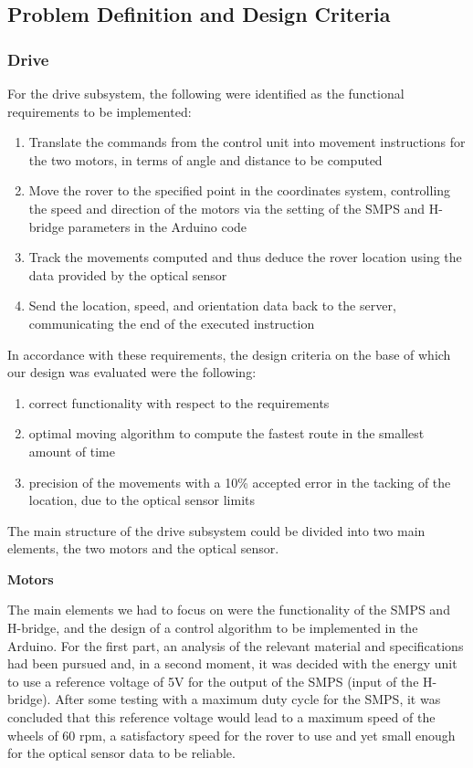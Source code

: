 \documentclass[10pt,twoside]{article}
\begin{document}
\subsection{Problem Definition and Design Criteria}

\subsubsection{Drive}

For the drive subsystem, the following were identified as the functional requirements to be implemented: 
\begin{enumerate} %
    \item Translate the commands from the control unit into movement instructions for the two motors, in terms of angle and distance to be computed
    \item Move the rover to the specified point in the coordinates system, controlling the speed and direction of the motors via the setting of the SMPS and H-bridge parameters in the Arduino code
    \item Track the movements computed and thus deduce the rover location using the data provided by the optical sensor
    \item Send the location, speed, and orientation data back to the server, communicating the end of the executed instruction
\end{enumerate}
In accordance with these requirements, the design criteria on the base of which our design was evaluated were the following:
\begin{enumerate}
    \item correct functionality with respect to the requirements
    \item optimal moving algorithm to compute the fastest route in the smallest amount of time
    \item precision of the movements with a 10\% accepted error in the tacking of the location, due to the optical sensor limits
\end{enumerate}
The main structure of the drive subsystem could be divided into two main elements, the two motors and the optical sensor.

\textbf{Motors}

The main elements we had to focus on were the functionality of the SMPS and H-bridge, and the design of a control algorithm to be implemented in the Arduino. For the first part, an analysis of the relevant material and specifications had been pursued and, in a second moment, it was decided with the energy unit to use a reference voltage of 5V for the output of the SMPS (input of the H-bridge). After some testing with a maximum duty cycle for the SMPS, it was concluded that this reference voltage would lead to a maximum speed of the wheels of 60 rpm, a satisfactory speed for the rover to use and yet small enough for the optical sensor data to be reliable.
\end{document}
